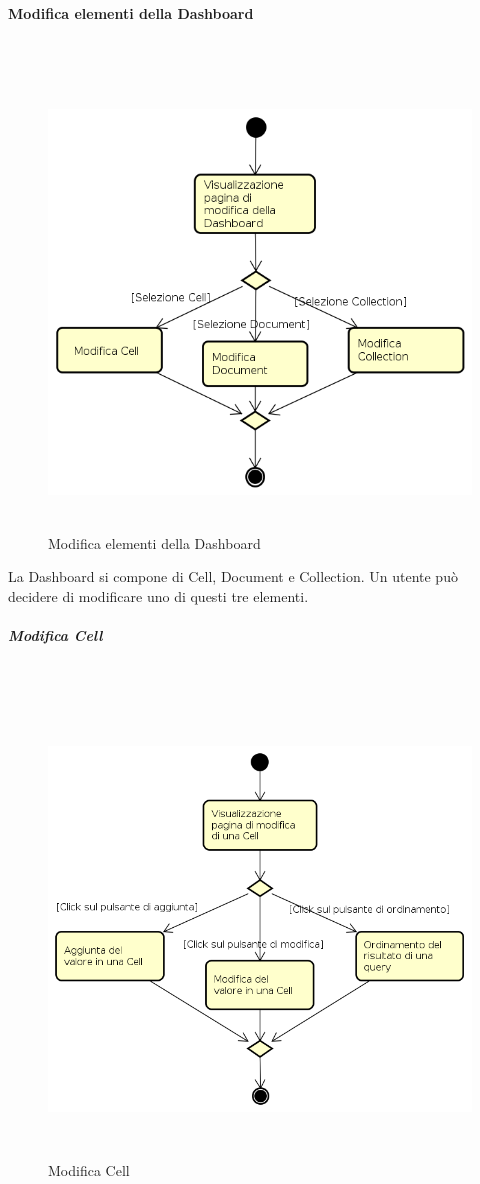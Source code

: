 \paragraph{Modifica elementi della Dashboard} \mbox{} \\
\begin{figure}[H]
\begin{center}
\includegraphics[height=12cm]{res/sections/backend/activities/modificaElementDashboard.png}
\caption{Modifica elementi della Dashboard}
\end{center}
\end{figure}
La Dashboard si compone di Cell, Document e Collection. Un utente può decidere di modificare uno di questi tre elementi.
\newpage
\subparagraph{Modifica Cell} \mbox{} \\
\begin{figure}[H]
\begin{center}
\includegraphics[height=12cm]{res/sections/backend/activities/modificaCell.png}
\caption{Modifica Cell}
\end{center}
\end{figure}
